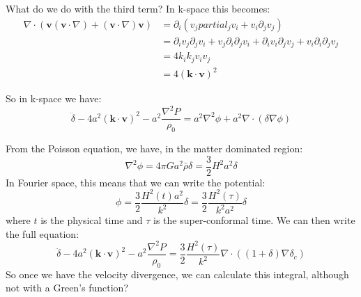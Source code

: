 \documentclass{article}
\begin{document}
What do we do with the third term? In k-space this becomes:
\begin{align*}
  \nabla \cdot ( \mathbf{v} (\mathbf{v} \cdot \nabla ) + ( \mathbf{v}
  \cdot \nabla ) \mathbf{v} ) &= \partial_i ( v_j partial_j v_i +
                                v_i \partial_j v_j ) \\
  &= \partial_i v_j \partial_j v_i + v_j \partial_i \partial_j v_i
    + \partial_i v_i \partial_j v_j + v_i \partial_i \partial_j v_j \\
  &= 4 k_i k_j v_i v_j \\
  &= 4 (\mathbf{k} \cdot \mathbf{v} )^2 
\end{align*} 

So in k-space we have:
\begin{equation}
  \ddot{\delta} - 4 a^2 ( \mathbf{k} \cdot \mathbf{v} )^2 - a^2
  \frac{\nabla^2 P }{\rho_0} = a^2 \nabla^2 \phi + a^2 \nabla \cdot(
  \delta \nabla \phi)
\end{equation}

From the Poisson equation, we have, in the matter dominated region:
\begin{equation}
  \nabla^2 \phi = 4 \pi G a^2 \bar{\rho}\delta = \frac{3}{2} H^2
  a^2 \delta 
\end{equation}
In Fourier space, this means that we can write the potential:
\begin{equation}
  \phi = \frac{3}{2} \frac{H^2(t)a^2}{k^2} \delta = \frac{3}{2}
  \frac{H^2(\tau) }{k^2 a^2} \delta 
\end{equation}
where $t$ is the physical time and $\tau$ is the super-conformal
time.  We can then write the full equation:
\begin{equation}
  \ddot{\delta} - 4 a^2 ( \mathbf{k} \cdot \mathbf{v} )^2 - a^2
  \frac{\nabla^2 P }{\rho_0} = \frac{3}{2} \frac{H^2(\tau)}{k^2} \nabla \cdot((1+
  \delta) \nabla \delta_c)
\end{equation}
So once we have the velocity divergence, we can calculate this
integral, although not with a Green's function?
\end{document}
